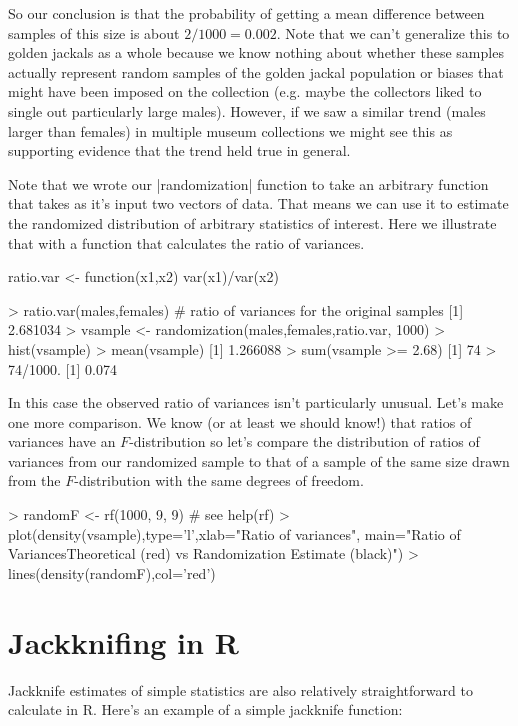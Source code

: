 So our conclusion is that the probability of getting a mean difference between samples of this size is about $2/1000=0.002$.  Note that we can't generalize this to golden jackals as a whole because we know nothing about whether these samples actually represent random samples of the golden jackal population or biases that might have been imposed on the collection (e.g. maybe the collectors liked to single out particularly large males). However, if we saw a similar trend (males larger than females) in multiple museum collections we might see this as supporting evidence that the trend held true in general.

Note that we wrote our |randomization| function to take an arbitrary function that takes as it's input two vectors of data. That means we can use it to estimate the randomized distribution of arbitrary statistics of interest. Here we illustrate that with a function that calculates the ratio of variances.

\begin{R}
ratio.var <- function(x1,x2){
    var(x1)/var(x2)
}

> ratio.var(males,females)  # ratio of variances for the original samples
[1] 2.681034
> vsample <- randomization(males,females,ratio.var, 1000)
> hist(vsample)
> mean(vsample)
[1] 1.266088
> sum(vsample >= 2.68)
[1] 74
> 74/1000.
[1] 0.074
\end{R}

In this case the observed ratio of variances isn't particularly unusual.  Let's make one more comparison. We know (or at least we should know!) that ratios of variances have an $F$-distribution so let's compare the distribution of ratios of variances from our randomized sample to that of a sample of the same size drawn from the $F$-distribution with the same degrees of freedom.

\begin{R}
> randomF <- rf(1000, 9, 9) # see help(rf)
> plot(density(vsample),type='l',xlab="Ratio of variances", main="Ratio of Variances\n Theoretical (red) vs Randomization Estimate (black)")
> lines(density(randomF),col='red')
\end{R}


\section{Jackknifing in R}

Jackknife estimates of simple statistics are also relatively straightforward to calculate in R. Here's an example of a simple jackknife function:

